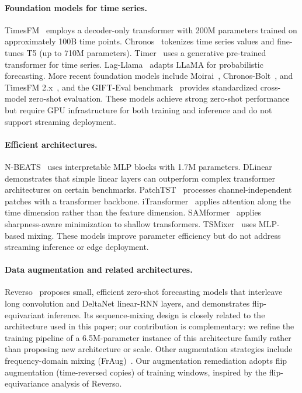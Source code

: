\documentclass[11pt]{article}
\begin{document}
\paragraph{Foundation models for time series.}
TimesFM~\cite{timesfm} employs a decoder-only transformer with 200M parameters trained on approximately 100B time points. Chronos~\cite{chronos} tokenizes time series values and fine-tunes T5 (up to 710M parameters). Timer~\cite{timer} uses a generative pre-trained transformer for time series. Lag-Llama~\cite{lagllama} adapts LLaMA for probabilistic forecasting. More recent foundation models include Moirai~\cite{moirai}, Chronos-Bolt~\cite{chronosbolt}, and TimesFM 2.x~\cite{timesfm2}, and the GIFT-Eval benchmark~\cite{gifteval} provides standardized cross-model zero-shot evaluation. These models achieve strong zero-shot performance but require GPU infrastructure for both training and inference and do not support streaming deployment.

\paragraph{Efficient architectures.}
N-BEATS~\cite{nbeats} uses interpretable MLP blocks with 1.7M parameters. DLinear~\cite{dlinear} demonstrates that simple linear layers can outperform complex transformer architectures on certain benchmarks. PatchTST~\cite{patchtst} processes channel-independent patches with a transformer backbone. iTransformer~\cite{itransformer} applies attention along the time dimension rather than the feature dimension. SAMformer~\cite{samformer} applies sharpness-aware minimization to shallow transformers. TSMixer~\cite{tsmixer} uses MLP-based mixing. These models improve parameter efficiency but do not address streaming inference or edge deployment.

\paragraph{Data augmentation and related architectures.}
Reverso~\cite{reverso} proposes small, efficient zero-shot forecasting models that interleave long convolution and DeltaNet linear-RNN layers, and demonstrates flip-equivariant inference. Its sequence-mixing design is closely related to the architecture used in this paper; our contribution is complementary: we refine the training pipeline of a 6.5M-parameter instance of this architecture family rather than proposing new architecture or scale. Other augmentation strategies include frequency-domain mixing (FrAug)~\cite{freqmix}. Our augmentation remediation adopts flip augmentation (time-reversed copies) of training windows, inspired by the flip-equivariance analysis of Reverso.
\end{document}
